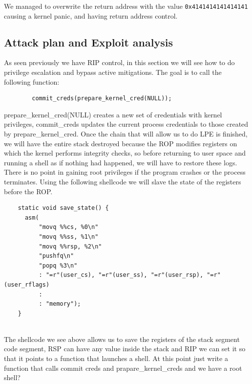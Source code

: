     
    We managed to overwrite the return address with the value \texttt{0x4141414141414141} causing a kernel panic, and having return address control.\newline
    \subsection{Attack plan and Exploit analysis}
    As seen previously we have RIP control, in this section we will see how to do privilege escalation and bypass active mitigations.\newline
    The goal is to call the following function:\newline
    \begin{verbatim}
        commit_creds(prepare_kernel_cred(NULL));
    \end{verbatim}
prepare\_kernel\_cred(NULL) creates a new set of credentials with kernel privileges, commit\_creds updates the current process credentials to those created by prepare\_kernel\_cred.\newline
    Once the chain that will allow us to do LPE is finished, we will have the entire stack destroyed because the ROP modifies registers on which the kernel performs integrity checks, so before returning to user space and running a shell as if nothing had happened, we will have to restore these logs.\newline
    There is no point in gaining root privileges if the program crashes or the process terminates.\newline
   Using the following shellcode we will slave the state of the registers before the ROP.\newline
    \begin{verbatim}
    static void save_state() {
      asm(
          "movq %%cs, %0\n"
          "movq %%ss, %1\n"
          "movq %%rsp, %2\n"
          "pushfq\n"
          "popq %3\n"
          : "=r"(user_cs), "=r"(user_ss), "=r"(user_rsp), "=r"(user_rflags)
          :
          : "memory");
    }
    
    \end{verbatim}
    The shellcode we see above allows us to save the registers of the stack segment code segment, RSP can have any value inside the stack and RIP we can set it so that it points to a function that launches a shell.\newline
    At this point just write a function that calls commit creds and prapare\_kernel\_creds and we have a root shell?\newline

